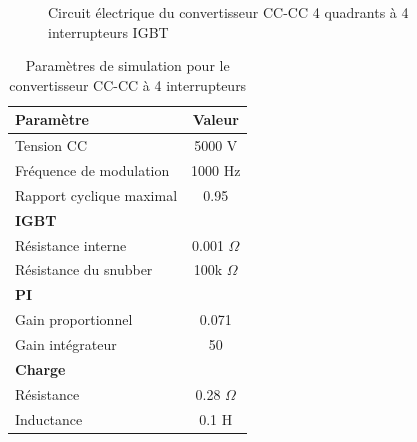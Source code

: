 \begin{figure}[htb]
\caption{Circuit électrique du convertisseur CC-CC 4 quadrants à 4 interrupteurs IGBT}
\label{i_hach}
\end{figure}

\begin{table}[htb]
\centering
\begin{tabular}{|l|c|} 
  \hline
  \textbf{Paramètre} & \textbf{Valeur}  \\
  \hline\hline
  Tension CC & 5000 V\\ \hline
  Fréquence de modulation & 1000 Hz\\ \hline
  Rapport cyclique maximal & 0.95 \\ \hline \hline
  \multicolumn{2}{|l|}{\textbf{IGBT}}\\ \hline
  Résistance interne & 0.001 $\Omega$\\
  Résistance du snubber & 100k $\Omega$\\ \hline \hline
   \multicolumn{2}{|l|}{\textbf{PI}}\\ \hline
  Gain proportionnel & 0.071 \\
  Gain intégrateur & 50 \\ \hline \hline
  \multicolumn{2}{|l|}{\textbf{Charge}}\\ \hline
  Résistance & 0.28 $\Omega$\\
  Inductance & 0.1 H\\
  \hline
\end{tabular}
\caption{Paramètres de simulation pour le convertisseur CC-CC à 4 interrupteurs}
\label{p_hash}
\end{table}

